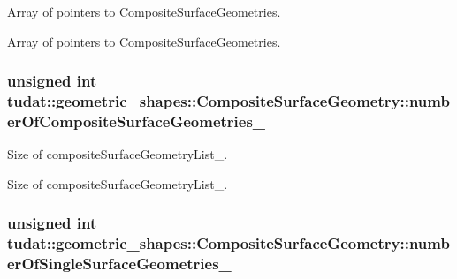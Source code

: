 Array of pointers to Composite\+Surface\+Geometries. 

Array of pointers to Composite\+Surface\+Geometries. 
\subsubsection[{\texorpdfstring{number\+Of\+Composite\+Surface\+Geometries\+\_\+}{numberOfCompositeSurfaceGeometries_}}]{\setlength{\rightskip}{0pt plus 5cm}unsigned int tudat\+::geometric\+\_\+shapes\+::\+Composite\+Surface\+Geometry\+::number\+Of\+Composite\+Surface\+Geometries\+\_\+\hspace{0.3cm}{\ttfamily [protected]}}\hypertarget{classtudat_1_1geometric__shapes_1_1CompositeSurfaceGeometry_a11b903bd3673915b555e647b98388e06}{}\label{classtudat_1_1geometric__shapes_1_1CompositeSurfaceGeometry_a11b903bd3673915b555e647b98388e06}


Size of composite\+Surface\+Geometry\+List\+\_\+. 

Size of composite\+Surface\+Geometry\+List\+\_\+. 
\subsubsection[{\texorpdfstring{number\+Of\+Single\+Surface\+Geometries\+\_\+}{numberOfSingleSurfaceGeometries_}}]{\setlength{\rightskip}{0pt plus 5cm}unsigned int tudat\+::geometric\+\_\+shapes\+::\+Composite\+Surface\+Geometry\+::number\+Of\+Single\+Surface\+Geometries\+\_\+\hspace{0.3cm}{\ttfamily [protected]}}\hypertarget{classtudat_1_1geometric__shapes_1_1CompositeSurfaceGeometry_a8ed9f8e2483f0cce40a90db9313844c1}{}\label{classtudat_1_1geometric__shapes_1_1CompositeSurfaceGeometry_a8ed9f8e2483f0cce40a90db9313844c1}


